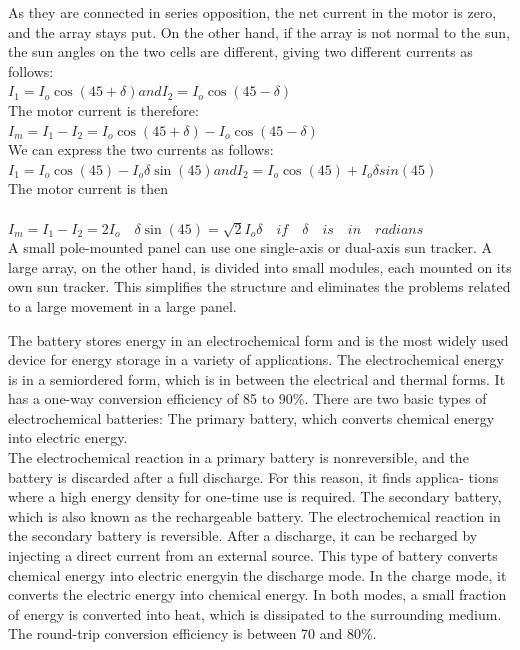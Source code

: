 As they are connected in series opposition, the net current in the motor is zero, and the array stays put. On the other hand, if the array is not normal to the sun, the sun angles on the two cells are different, giving two different currents as follows: \\
$I_1 = I_o \cos(45 + \delta) and I_2 = I_o \cos(45 - \delta)$ \\
The motor current is therefore: \\
$I_m = I_1 - I_2 = I_o \cos(45 + \delta) - I_o \cos(45 - \delta)$ \\
We can express the two currents as follows: \\
$I_1 = I_o \cos (45) - I_o \delta \sin (45) and I_2 = I_o \cos (45) + I_o \delta sin (45)$ \\
The motor current is then\\
\\
$I_m = I_1 - I_2 = 2 I_o \quad \delta \sin (45) = \sqrt{2} I_o \delta \quad if \quad \delta \quad is \quad in \quad radians$ \\
A small pole-mounted panel can use one single-axis or dual-axis sun tracker. A large array, on the other hand, is divided into small modules, each mounted on its own sun tracker. This simplifies the structure and eliminates the problems related to a large movement in a large panel.



\newpage

The battery stores energy in an electrochemical form and is the most widely used device for energy storage in a variety of applications. The electrochemical energy is in a semiordered form, which is in between the electrical and thermal forms. It has a one-way conversion efficiency of 85 to 90\%.
There are two basic types of electrochemical batteries:
The primary battery, which converts chemical energy into electric energy.\\
The electrochemical reaction in a primary battery is nonreversible, and the battery is discarded after a full discharge. For this reason, it finds applica- tions where a high energy density for one-time use is required.
The secondary battery, which is also known as the rechargeable battery.
The electrochemical reaction in the secondary battery is reversible. After a discharge, it can be recharged by injecting a direct current from an external source. This type of battery converts chemical energy into electric energyin the discharge mode. In the charge mode, it converts the electric energy into chemical energy. In both modes, a small fraction of energy is converted into heat, which is dissipated to the surrounding medium. The round-trip conversion efficiency is between 70 and 80\%.

